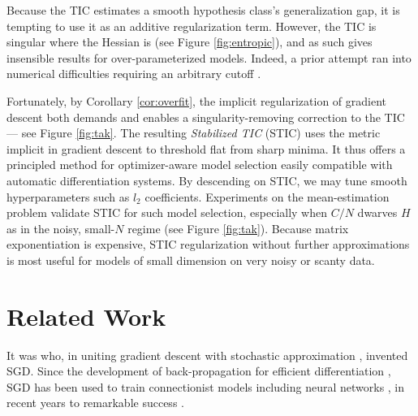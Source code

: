 \documentclass{article}
\begin{document}
        Because the TIC estimates a smooth hypothesis class's generalization
        gap, it is tempting to use it as an additive regularization term.
        However, the TIC is singular where the Hessian is (see Figure
        \ref{fig:entropic}), and as such gives insensible results for
        over-parameterized models.  Indeed, a prior attempt ran into numerical
        difficulties requiring an arbitrary cutoff \citep{di18}. 

        Fortunately, by Corollary \ref{cor:overfit}, the implicit
        regularization of gradient descent both demands and enables a
        singularity-removing correction to the TIC --- see Figure
        \ref{fig:tak}.  The resulting \emph{Stabilized TIC} (STIC) uses the
        metric implicit in gradient descent to threshold flat from sharp
        minima.  It thus offers a principled method for optimizer-aware model
        selection easily compatible with automatic differentiation systems.  By
        descending on STIC, we may tune smooth hyperparameters such as $l_2$
        coefficients.  Experiments on the mean-estimation problem validate STIC
        for such model selection, especially when $C/N$ dwarves $H$ as in the
        noisy, small-$N$ regime (see Figure \ref{fig:tak}).  Because matrix
        exponentiation is expensive, STIC regularization without further
        approximations is most useful for models of small dimension
        on very noisy or scanty data.


\section{Related Work}


    It was \citet{ki52} who, in uniting gradient descent \citep{ca47} with
    stochastic approximation \citep{ro51}, invented SGD.  Since the development
    of back-propagation for efficient differentiation \citep{we74}, SGD
    has been used to train connectionist models including neural
    networks \citep{bo91}, in recent years to remarkable success \citep{le15}.
\end{document}
